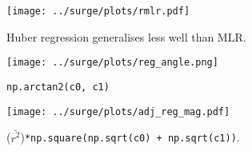 
\begin{figure*}
\centering
 \hspace{-40pt} \texttt{[image: ../surge/plots/rmlr.pdf]}
  \vspace{-15pt}
 \caption{Huber regression generalises less well than MLR.}
 \label{fig:tau-tau-resp}
 \hspace{-40pt} \texttt{[image: ../surge/plots/reg\_angle.png]}
  \vspace{-15pt}
 \caption{\texttt{np.arctan2(c0, c1)}}
  \label{fig:tau-tau-angle}
  \hspace{-40pt} \texttt{[image: ../surge/plots/adj\_reg\_mag.pdf]}
   \vspace{-15pt}
  \caption{($\bar{r^2}$)\texttt{*np.square(np.sqrt(c0) + np.sqrt(c1))}. }
   \label{fig:tau-tau-responsiveness}
\end{figure*}
